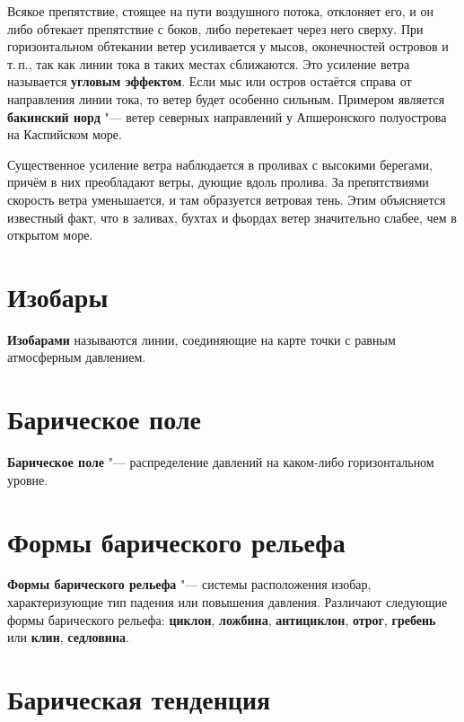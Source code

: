 \documentclass[a4paper, 12pt, twoside, draft, book, russian, fittopage, cyremdash, openright]{ncc}
\begin{document}
Всякое препятствие, стоящее на пути воздушного потока, отклоняет его,
и он либо обтекает препятствие с боков, либо перетекает через него
сверху. При горизонтальном обтекании ветер усиливается у мысов,
оконечностей островов и т.\,п., так как линии тока в таких местах
сближаются. Это усиление ветра называется \textbf{угловым
  эффектом}. Если мыс или остров остаётся справа
от направления линии тока, то ветер будет особенно сильным. Примером
является \textbf{бакинский норд} "--- ветер
северных направлений у Апшеронского полуострова на Каспийском море.

Существенное усиление ветра наблюдается в проливах с высокими
берегами, причём в них преобладают ветры, дующие вдоль пролива.  За
препятствиями скорость ветра уменьшается, и там образуется ветровая
тень. Этим объясняется известный факт, что в заливах, бухтах и фьордах
ветер значительно слабее, чем в открытом море.

\section{Изобары}
\label{sec:isobars}

\textbf{Изобарами} называются линии, соединяющие на карте точки с равным атмосферным давлением.

\section{Барическое поле}
\label{sec:baric_field}

\textbf{Барическое поле} "--- распределение давлений на каком-либо горизонтальном уровне.

\section{Формы барического рельефа}
\label{sec:baric_relief}

\textbf{Формы барического рельефа}
"--- системы расположения изобар, характеризующие тип падения или
повышения давления. Различают следующие формы барического рельефа:
\textbf{циклон}, \textbf{ложбина}, \textbf{антициклон},
\textbf{отрог}, \textbf{гребень} или \textbf{клин},
\textbf{седловина}.

\section{Барическая тенденция}
\label{sec:baric_tendency}
\end{document}
